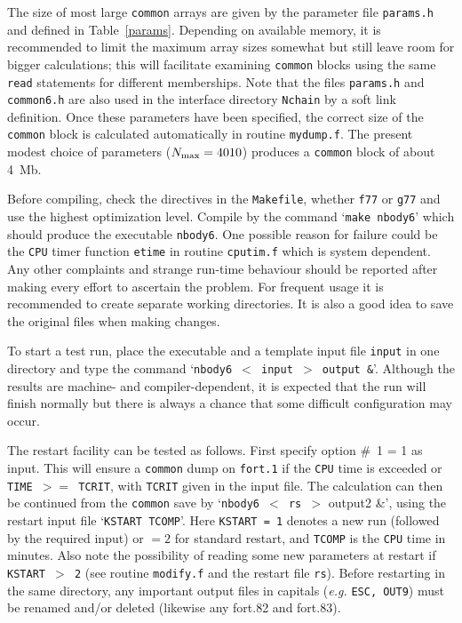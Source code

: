 \documentclass[12pt]{article}
\begin{document}
The size of most large {\tt common} arrays are given by the parameter file
{\tt params.h} and defined in Table~\ref{params}.
Depending on available memory, it is recommended to limit the maximum array
sizes somewhat but still leave room for bigger calculations; this will
facilitate examining {\tt common} blocks using the same {\tt read}
statements for different memberships.
Note that the files {\tt params.h} and {\tt common6.h} are also used in the
interface directory {\tt Nchain} by a soft link definition.
Once these parameters have been specified, the correct size of the
{\tt common} block is calculated automatically in routine {\tt mydump.f}.
The present modest choice of parameters ($N_{\rm max} = 4010$) produces a
{\tt common} block of about 4~Mb.

Before compiling, check the {} directives in the {\tt Makefile},
\ie whether {\tt f77} or {\tt g77} and use the highest optimization level.
Compile by the command `{\tt make nbody6}' which should produce the
executable {\tt nbody6}.
One possible reason for failure could be the {\tt CPU} timer function
{\tt etime} in routine {\tt cputim.f} which is system dependent.
Any other complaints and strange run-time behaviour should be reported after
making every effort to ascertain the problem.
For frequent usage it is recommended to create separate working directories.
It is also a good idea to save the original files when making changes.

To start a test run, place the executable and a template input file
{\tt input} in one directory and type the command
`{\tt nbody6 $<$ input $>$ output \&}'.
Although the results are machine- and compiler-dependent, it is expected that
the run will finish normally but there is always a chance that some difficult
configuration may occur.

The restart facility can be tested as follows.
First specify option \#~1 = 1 as input.
This will ensure a {\tt common} dump on {\tt fort.1} if the {\tt CPU} time is
exceeded or {\tt TIME $>=$ TCRIT}, with {\tt TCRIT} given in the input file.
The calculation can then be continued from the {\tt common} save by
`{\tt nbody6 $<$ rs $>$} output2 \&',
using the restart input file `{\tt KSTART TCOMP}'.
Here {\tt KSTART = 1} denotes a new run (followed by the required input)
or $= 2$ for standard restart, and {\tt TCOMP} is the {\tt CPU} time in
minutes.
Also note the possibility of reading some new parameters at restart if
{\tt KSTART $>$ 2} (see routine {\tt modify.f} and the restart
file {\tt rs}).
Before restarting in the same directory, any important output files in
capitals ({\it e.g.} {\tt ESC, OUT9}) must be renamed and/or deleted
(likewise any fort.82 and fort.83).
\end{document}
